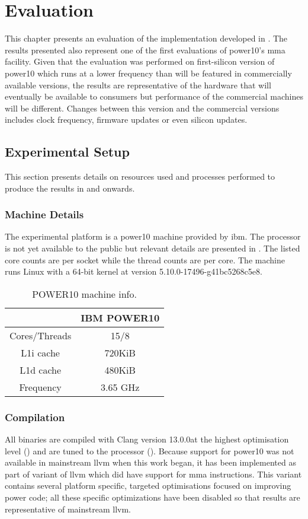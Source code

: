 \documentclass[\main/thesis.tex]{subfiles}
\begin{document}
\chapter{Evaluation}
\label{cha:evaluation}
This chapter presents an evaluation of the implementation developed in .
The results presented also represent one of the first evaluations of \gls{power10}'s \gls{mma} facility.
Given that the evaluation was performed on first-silicon version of \gls{power10} which runs at a lower frequency than will be featured in commercially available versions, the results are representative of the hardware that will eventually be available to consumers but performance of the commercial machines will be different.
Changes between this version and the commercial versions includes clock frequency, firmware updates or even silicon updates.

\section{Experimental Setup}
This section presents details on resources used and processes performed to produce the results in  and onwards.

\subsection{Machine Details}
The experimental platform is a \gls{power10} machine provided by \gls{ibm}.
The processor is not yet available to the public but relevant details are presented in .
The listed core counts are per socket while the thread counts are per core.
The machine runs Linux with a 64-bit kernel at version 5.10.0-17496-g41bc5268c5e8.

\begin{table}[t]
  \centering
  \begin{tabular}{c | c}
    & IBM POWER10\\\hline
    Cores/Threads & 15/8\\
    L1i cache & 720KiB\\
    L1d cache & 480KiB\\
    Frequency & 3.65 GHz\\
  \end{tabular}
  \caption{POWER10 machine info.}
  \label{tab:machineInfo}
\end{table}

\subsection{Compilation}
All binaries are compiled with Clang version 13.0.0\footnotemark at the highest optimisation level () and are tuned to the processor ().
Because support for \gls{power10} was not available in mainstream \gls{llvm} when this work began, it has been implemented as part of  variant of \gls{llvm} which did have support for \gls{mma} instructions.
This variant contains several platform specific, targeted optimisations focused on improving \gls{power} code; all these specific optimizations have been disabled so that results are representative of mainstream \gls{llvm}.
\end{document}
